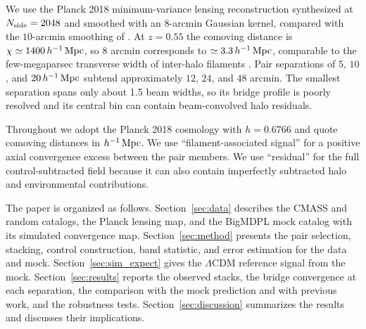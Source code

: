 We use the Planck 2018 minimum-variance lensing reconstruction
\citep{Planck2018lensing} synthesized at $N_{\rm side}=2048$ and smoothed with
an $8$-arcmin Gaussian kernel, compared with the $10$-arcmin smoothing of
\citet{deGraaff2019}. At $z=0.55$ the comoving distance is
$\chi\simeq1400\,h^{-1}\,{\rm Mpc}$, so $8$ arcmin corresponds to $\simeq3.3\,h^{-1}\,{\rm Mpc}$,
comparable to the few-megaparsec transverse width of inter-halo filaments
\citep{Colberg2005}. Pair separations of $5$, $10$, and $20\,h^{-1}\,{\rm Mpc}$ subtend
approximately $12$, $24$, and $48$ arcmin. The smallest separation spans only
about 1.5 beam widths, so its bridge profile is poorly resolved and its
central bin can contain beam-convolved halo residuals.

Throughout we adopt the Planck 2018 cosmology with $h=0.6766$ and quote
comoving distances in $h^{-1}\,{\rm Mpc}$. We use ``filament-associated signal'' for a
positive axial convergence excess between the pair members. We use
``residual'' for the full control-subtracted field because it can also contain
imperfectly subtracted halo and environmental contributions.

The paper is organized as follows. Section~\ref{sec:data} describes the
CMASS and random catalogs, the Planck lensing map, and the BigMDPL mock
catalog with its simulated convergence map. Section~\ref{sec:method}
presents the pair selection, stacking, control construction, band statistic,
and error estimation for the data and mock.
Section~\ref{sec:sim_expect} gives the $\Lambda$CDM reference signal from the
mock. Section~\ref{sec:results} reports the observed stacks, the bridge
convergence at each separation, the comparison with the mock prediction and
with previous work, and the robustness tests. Section~\ref{sec:discussion}
summarizes the results and discusses their implications.
